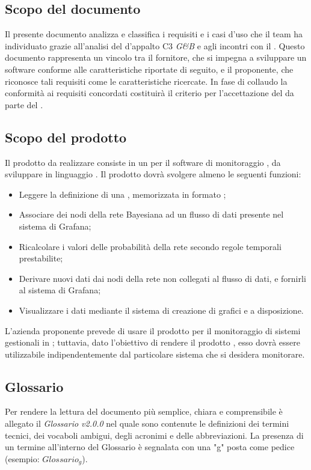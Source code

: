 \subsection{Scopo del documento}
Il presente documento analizza e classifica i requisiti e i casi d'uso che il team ha individuato grazie all'analisi del  d'appalto C3 \emph{G\&B} e agli incontri con il .
Questo documento rappresenta un vincolo tra il fornitore, che si impegna a sviluppare un
software conforme alle caratteristiche riportate di seguito, e il proponente, che riconosce tali
requisiti come le caratteristiche ricercate.
In fase di collaudo la conformità ai requisiti concordati costituirà il criterio per l'accettazione
del  da parte del .
\subsection{Scopo del prodotto}
Il prodotto da realizzare consiste in un  per il software di monitoraggio , da sviluppare in linguaggio . Il prodotto dovrà svolgere almeno le seguenti funzioni:
\begin{itemize}
	\item{Leggere la definizione di una , memorizzata in formato ;}
	\item{Associare dei nodi della rete Bayesiana ad un flusso di dati presente nel sistema di Grafana;}
	\item{Ricalcolare i valori delle probabilità della rete secondo regole temporali prestabilite;}
	\item{Derivare nuovi dati dai nodi della rete non collegati al flusso di dati, e fornirli al sistema di Grafana;}
	\item{Visualizzare i dati mediante il sistema di creazione di grafici e  a disposizione.}
\end{itemize}
L'azienda proponente prevede di usare il prodotto per il monitoraggio di sistemi gestionali in ; tuttavia, dato l'obiettivo di rendere il prodotto , esso dovrà essere utilizzabile indipendentemente dal particolare sistema che si desidera monitorare.
\subsection{Glossario}
Per rendere la lettura del documento più semplice, chiara e comprensibile è allegato il \emph{Glossario v2.0.0} nel quale sono contenute le definizioni dei termini tecnici, dei vocaboli ambigui, degli acronimi e delle abbreviazioni. La presenza di un termine all'interno del Glossario è segnalata con una "g" posta come pedice (esempio: $Glossario_{g}$).

